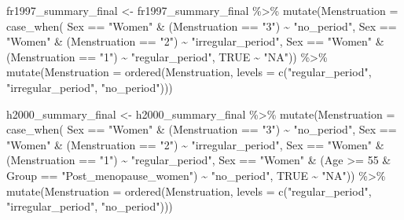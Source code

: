 \documentclass[
]{article}
\newenvironment{Shaded}{\begin{snugshade}}{\end{snugshade}}
\newcommand{\AttributeTok}[1]{\textcolor[rgb]{0.77,0.63,0.00}{#1}}
\newcommand{\ConstantTok}[1]{\textcolor[rgb]{0.00,0.00,0.00}{#1}}
\newcommand{\DecValTok}[1]{\textcolor[rgb]{0.00,0.00,0.81}{#1}}
\newcommand{\FunctionTok}[1]{\textcolor[rgb]{0.00,0.00,0.00}{#1}}
\newcommand{\NormalTok}[1]{#1}
\newcommand{\OtherTok}[1]{\textcolor[rgb]{0.56,0.35,0.01}{#1}}
\newcommand{\SpecialCharTok}[1]{\textcolor[rgb]{0.00,0.00,0.00}{#1}}
\newcommand{\StringTok}[1]{\textcolor[rgb]{0.31,0.60,0.02}{#1}}
\begin{document}
\begin{Shaded}
\begin{Highlighting}[]
\NormalTok{fr1997\_summary\_final }\OtherTok{\textless{}{-}}\NormalTok{ fr1997\_summary\_final }\SpecialCharTok{\%\textgreater{}\%} 
  \FunctionTok{mutate}\NormalTok{(}\AttributeTok{Menstruation =} \FunctionTok{case\_when}\NormalTok{(}
\NormalTok{    Sex }\SpecialCharTok{==} \StringTok{"Women"} \SpecialCharTok{\&}\NormalTok{ (Menstruation }\SpecialCharTok{==} \StringTok{"3"}\NormalTok{) }\SpecialCharTok{\textasciitilde{}} \StringTok{"no\_period"}\NormalTok{,}
\NormalTok{    Sex }\SpecialCharTok{==} \StringTok{"Women"} \SpecialCharTok{\&}\NormalTok{ (Menstruation }\SpecialCharTok{==} \StringTok{"2"}\NormalTok{) }\SpecialCharTok{\textasciitilde{}} \StringTok{"irregular\_period"}\NormalTok{,}
\NormalTok{    Sex }\SpecialCharTok{==} \StringTok{"Women"} \SpecialCharTok{\&}\NormalTok{ (Menstruation }\SpecialCharTok{==} \StringTok{"1"}\NormalTok{) }\SpecialCharTok{\textasciitilde{}} \StringTok{"regular\_period"}\NormalTok{,}
    \ConstantTok{TRUE} \SpecialCharTok{\textasciitilde{}} \StringTok{"NA"}\NormalTok{)) }\SpecialCharTok{\%\textgreater{}\%} 
  \FunctionTok{mutate}\NormalTok{(}\AttributeTok{Menstruation =} \FunctionTok{ordered}\NormalTok{(Menstruation, }\AttributeTok{levels =}  \FunctionTok{c}\NormalTok{(}\StringTok{"regular\_period"}\NormalTok{, }\StringTok{"irregular\_period"}\NormalTok{, }\StringTok{"no\_period"}\NormalTok{))) }

\NormalTok{h2000\_summary\_final }\OtherTok{\textless{}{-}}\NormalTok{ h2000\_summary\_final }\SpecialCharTok{\%\textgreater{}\%} 
  \FunctionTok{mutate}\NormalTok{(}\AttributeTok{Menstruation =} \FunctionTok{case\_when}\NormalTok{(}
\NormalTok{    Sex }\SpecialCharTok{==} \StringTok{"Women"} \SpecialCharTok{\&}\NormalTok{ (Menstruation }\SpecialCharTok{==} \StringTok{"3"}\NormalTok{) }\SpecialCharTok{\textasciitilde{}} \StringTok{"no\_period"}\NormalTok{,}
\NormalTok{    Sex }\SpecialCharTok{==} \StringTok{"Women"} \SpecialCharTok{\&}\NormalTok{ (Menstruation }\SpecialCharTok{==} \StringTok{"2"}\NormalTok{) }\SpecialCharTok{\textasciitilde{}} \StringTok{"irregular\_period"}\NormalTok{,}
\NormalTok{    Sex }\SpecialCharTok{==} \StringTok{"Women"} \SpecialCharTok{\&}\NormalTok{ (Menstruation }\SpecialCharTok{==} \StringTok{"1"}\NormalTok{) }\SpecialCharTok{\textasciitilde{}} \StringTok{"regular\_period"}\NormalTok{,}
\NormalTok{    Sex }\SpecialCharTok{==} \StringTok{"Women"} \SpecialCharTok{\&}\NormalTok{ (Age }\SpecialCharTok{\textgreater{}=} \DecValTok{55} \SpecialCharTok{\&}\NormalTok{ Group }\SpecialCharTok{==} \StringTok{"Post\_menopause\_women"}\NormalTok{) }\SpecialCharTok{\textasciitilde{}} \StringTok{"no\_period"}\NormalTok{,}
    \ConstantTok{TRUE} \SpecialCharTok{\textasciitilde{}} \StringTok{"NA"}\NormalTok{)) }\SpecialCharTok{\%\textgreater{}\%} 
  \FunctionTok{mutate}\NormalTok{(}\AttributeTok{Menstruation =} \FunctionTok{ordered}\NormalTok{(Menstruation, }\AttributeTok{levels =}  \FunctionTok{c}\NormalTok{(}\StringTok{"regular\_period"}\NormalTok{, }\StringTok{"irregular\_period"}\NormalTok{, }\StringTok{"no\_period"}\NormalTok{))) }
\end{Highlighting}
\end{Shaded}
\end{document}
